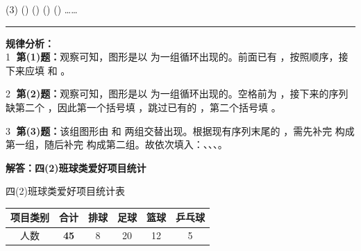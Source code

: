 \documentclass[12pt, a4paper]{ctexart}
\begin{document}
\vspace{0.8cm}

\noindent
(3) \tikzSolidTriangle{} \tikzStar{} \tikzStar{} \tikzSolidTriangle{} \tikzSolidTriangle{} \tikzSolidTriangle{} \tikzSolidTriangle{} \tikzStar{} \tikzStar{} \tikzSolidTriangle{} \tikzStar{} () () () \tikzStar{} () ……

\vspace{1.2cm}
\hrule
\vspace{0.4cm}

{\small\color{gray}
\textbf{规律分析：}\\
\textcircled{1} \textbf{第(1)题：}观察可知，图形是以 \tikzTriangle{} \tikzCircle{} \tikzSquare{} 为一组循环出现的。前面已有 \tikzTriangle{} \tikzCircle{}，按照顺序，接下来应填 \tikzSquare{} 和 \tikzTriangle{}。

\vspace{0.3cm}
\textcircled{2} \textbf{第(2)题：}观察可知，图形是以 \tikzSquare{} \tikzSquare{} \tikzCircle{} \tikzTriangle{} 为一组循环出现的。空格前为 \tikzSquare{}，接下来的序列缺第二个 \tikzSquare{}，因此第一个括号填 \tikzSquare{}，跳过已有的 \tikzCircle{}，第二个括号填 \tikzTriangle{}。

\vspace{0.3cm}
\textcircled{3} \textbf{第(3)题：}该组图形由 \tikzSolidTriangle{} \tikzStar{} \tikzStar{} 和 \tikzSolidTriangle{} \tikzSolidTriangle{} \tikzSolidTriangle{} 两组交替出现。根据现有序列末尾的 \tikzSolidTriangle{} \tikzStar{}，需先补完 \tikzStar{} 构成第一组，随后补完 \tikzSolidTriangle{} \tikzSolidTriangle{} \tikzSolidTriangle{} 构成第二组。故依次填入：\tikzStar{}、\tikzSolidTriangle{}、\tikzSolidTriangle{}、\tikzSolidTriangle{}。
}


\newpage

\begin{center}
  {\large\bfseries 解答：四(2)班球类爱好项目统计}
\end{center}

\vspace{0.4cm}

\begin{center}
  {\small 四(2)班球类爱好项目统计表} \\
  \vspace{0.2cm}
  \renewcommand{\arraystretch}{1.5}
  \begin{tabular}{|c|c|c|c|c|c|}
    \hline
    项目类别 & 合计 & 排球 & 足球 & 篮球 & 乒乓球 \\
    \hline
    人数 & \textbf{\textcolor{red!70!black}{45}} & 8 & 20 & 12 & 5 \\
    \hline
  \end{tabular}
\end{center}
\end{document}
